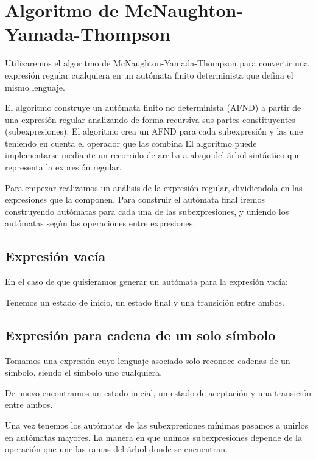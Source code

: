 
\section{Algoritmo de McNaughton-Yamada-Thompson}

Utilizaremos el algoritmo de McNaughton-Yamada-Thompson \cite{dragon} \cite{Thompson:1968:PTR:363347.363387} para convertir una expresión regular cualquiera en un autómata finito determinista que defina el mismo lenguaje.

El algoritmo construye un autómata finito no determinista (AFND) a partir de una expresión regular analizando de forma recursiva sus partes constituyentes (subexpresiones).
El algoritmo crea un AFND para cada subexpresión y las une teniendo en cuenta el operador que las combina
El algoritmo puede implementarse mediante un recorrido de arriba a abajo del árbol sintáctico que representa la expresión regular.

Para empezar realizamos un análisis de la expresión regular, dividiendola en las expresiones que la componen.
Para construir el autómata final iremos construyendo autómatas para cada una de las subexpresiones, y uniendo los autómatas según las operaciones entre expresiones.

\subsection{Expresión vacía}
En el caso de que quisieramos generar un autómata para la expresión vacía:


Tenemos un estado de inicio, un estado final y una transición entre ambos.

\subsection{Expresión para cadena de un solo símbolo}
Tomamos una expresión cuyo lenguaje asociado solo reconoce cadenas de un símbolo, siendo el símbolo uno cualquiera.


De nuevo encontramos un estado inicial, un estado de aceptación y una transición entre ambos.

Una vez tenemos los autómatas de las subexpresiones mínimas pasamos a unirlos en autómatas mayores.
La manera en que unimos subexpresiones depende de la operación que une las ramas del árbol donde se encuentran.

